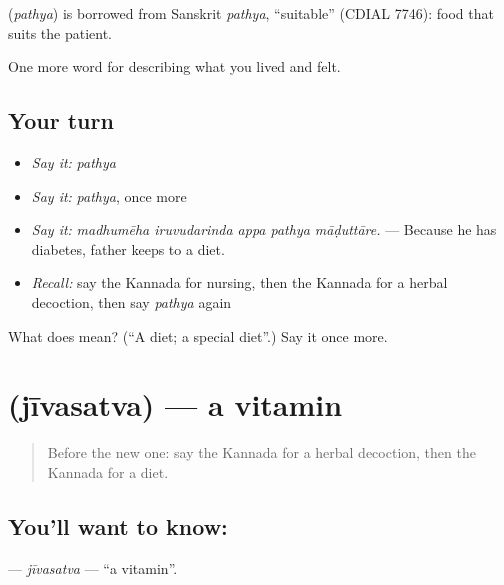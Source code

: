 \begin{cousinweb}
\textbf{} (\emph{pathya}) is borrowed from Sanskrit \emph{pathya}, \textquotedblleft{}suitable\textquotedblright{} (CDIAL 7746): food that suits the patient.
\end{cousinweb}

\begin{grammarlens}[title={What you've built}]
One more word for describing what you lived and felt.
\end{grammarlens}

\subsection*{Your turn}
\begin{itemize}
\raggedright
  \item \emph{Say it:} \emph{pathya}
  \item \emph{Say it:} \emph{pathya}, once more
  \item \emph{Say it:} \emph{madhumēha iruvudarinda appa pathya māḍuttāre.} — Because he has diabetes, father keeps to a diet.
  \item \emph{Recall:} say the Kannada for nursing, then the Kannada for a herbal decoction, then say \emph{pathya} again
\end{itemize}

\begin{tcolorbox}[breakable,colback=teal!4,colframe=teal!35!black,title={Before you move on}]
What does  mean? (\textquotedblleft{}A diet; a special diet\textquotedblright{}.) Say it once more.
\end{tcolorbox}
\section[\texorpdfstring{\kn{ಜೀವಸತ್ವ} (jīvasatva)}{ಜೀವಸತ್ವ (jīvasatva)}]{ (jīvasatva) — a vitamin}

\label{lesson:KA-C514-jivasatva}



\begin{quote}
Before the new one: say the Kannada for a herbal decoction, then the Kannada for a diet.
\end{quote}

\subsection*{You'll want to know: }
\textbf{} — \emph{jīvasatva} — \textquotedblleft{}a vitamin\textquotedblright{}.

